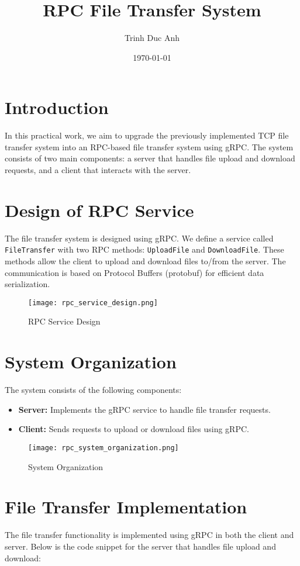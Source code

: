 \documentclass{article}
\title{RPC File Transfer System}
\author{Trinh Duc Anh}
\date{\today}
\begin{document}
\maketitle

\section{Introduction}
In this practical work, we aim to upgrade the previously implemented TCP file transfer system into an RPC-based file transfer system using gRPC. The system consists of two main components: a server that handles file upload and download requests, and a client that interacts with the server.

\section{Design of RPC Service}
The file transfer system is designed using gRPC. We define a service called \texttt{FileTransfer} with two RPC methods: \texttt{UploadFile} and \texttt{DownloadFile}. These methods allow the client to upload and download files to/from the server. The communication is based on Protocol Buffers (protobuf) for efficient data serialization.

\begin{figure}[h!]
\centering
\texttt{[image: rpc\_service\_design.png]}
\caption{RPC Service Design}
\end{figure}

\section{System Organization}
The system consists of the following components:
\begin{itemize}
    \item \textbf{Server:} Implements the gRPC service to handle file transfer requests.
    \item \textbf{Client:} Sends requests to upload or download files using gRPC.
\end{itemize}

\begin{figure}[h!]
\centering
\texttt{[image: rpc\_system\_organization.png]}
\caption{System Organization}
\end{figure}

\section{File Transfer Implementation}
The file transfer functionality is implemented using gRPC in both the client and server. Below is the code snippet for the server that handles file upload and download:
\end{document}
